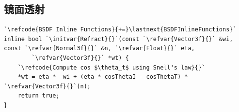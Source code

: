 \subsection{镜面透射}\label{sub:镜面透射}
\begin{lstlisting}
`\refcode{BSDF Inline Functions}{+=}\lastnext{BSDFInlineFunctions}`
inline bool `\initvar{Refract}{}`(const `\refvar{Vector3f}{}` &wi, const `\refvar{Normal3f}{}` &n, `\refvar{Float}{}` eta,
        `\refvar{Vector3f}{}` *wt) {
    `\refcode{Compute cos $\theta_t$ using Snell's law}{}`
    *wt = eta * -wi + (eta * cosThetaI - cosThetaT) * `\refvar{Vector3f}{}`(n);
    return true;
}
\end{lstlisting}
